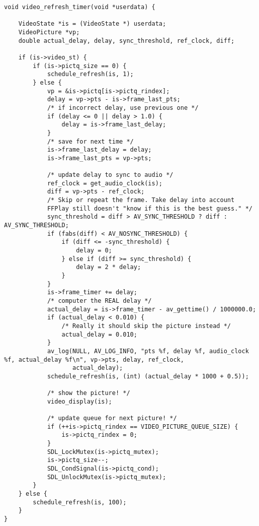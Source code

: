 \begin{lstlisting}
void video_refresh_timer(void *userdata) {

    VideoState *is = (VideoState *) userdata;
    VideoPicture *vp;
    double actual_delay, delay, sync_threshold, ref_clock, diff;

    if (is->video_st) {
        if (is->pictq_size == 0) {
            schedule_refresh(is, 1);
        } else {
            vp = &is->pictq[is->pictq_rindex];
            delay = vp->pts - is->frame_last_pts;
            /* if incorrect delay, use previous one */
            if (delay <= 0 || delay > 1.0) {
                delay = is->frame_last_delay;
            }
            /* save for next time */
            is->frame_last_delay = delay;
            is->frame_last_pts = vp->pts;

            /* update delay to sync to audio */
            ref_clock = get_audio_clock(is);
            diff = vp->pts - ref_clock;
            /* Skip or repeat the frame. Take delay into account
            FFPlay still doesn't "know if this is the best guess." */
            sync_threshold = diff > AV_SYNC_THRESHOLD ? diff : AV_SYNC_THRESHOLD;
            if (fabs(diff) < AV_NOSYNC_THRESHOLD) {
                if (diff <= -sync_threshold) {
                    delay = 0;
                } else if (diff >= sync_threshold) {
                    delay = 2 * delay;
                }
            }
            is->frame_timer += delay;
            /* computer the REAL delay */
            actual_delay = is->frame_timer - av_gettime() / 1000000.0;
            if (actual_delay < 0.010) {
                /* Really it should skip the picture instead */
                actual_delay = 0.010;
            }
            av_log(NULL, AV_LOG_INFO, "pts %f, delay %f, audio_clock %f, actual_delay %f\n", vp->pts, delay, ref_clock,
                   actual_delay);
            schedule_refresh(is, (int) (actual_delay * 1000 + 0.5));

            /* show the picture! */
            video_display(is);

            /* update queue for next picture! */
            if (++is->pictq_rindex == VIDEO_PICTURE_QUEUE_SIZE) {
                is->pictq_rindex = 0;
            }
            SDL_LockMutex(is->pictq_mutex);
            is->pictq_size--;
            SDL_CondSignal(is->pictq_cond);
            SDL_UnlockMutex(is->pictq_mutex);
        }
    } else {
        schedule_refresh(is, 100);
    }
}
\end{lstlisting}

